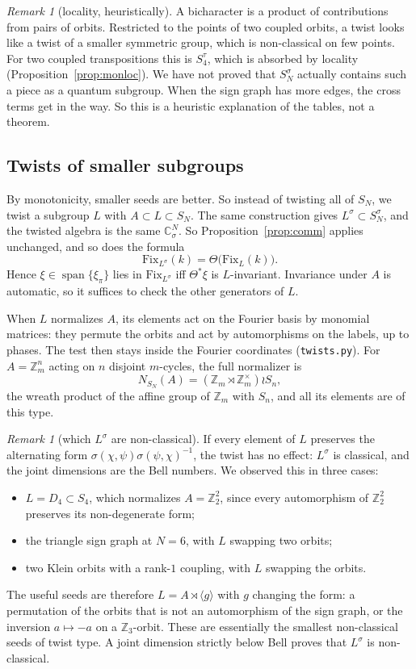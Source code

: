 \documentclass[11pt]{amsart}
\theoremstyle{definition}
\theoremstyle{remark}
\newtheorem{remark}[theorem]{Remark}
\theoremstyle{plain}
\numberwithin{equation}{section}
\numberwithin{table}{section}
\newcommand{\C}{\mathbb C}
\newcommand{\Z}{\mathbb Z}
\newcommand{\Fix}{\mathrm{Fix}}
\DeclareMathOperator{\spn}{span}
\begin{document}
\begin{remark}[locality, heuristically]
A bicharacter is a product of contributions from pairs of orbits. Restricted to the points of two coupled orbits, a twist looks like a twist of a smaller symmetric group, which is non-classical on few points. For two coupled transpositions this is $S_4^\tau$, which is absorbed by locality (Proposition~\ref{prop:monloc}). We have not proved that $S_N^\sigma$ actually contains such a piece as a quantum subgroup. When the sign graph has more edges, the cross terms get in the way. So this is a heuristic explanation of the tables, not a theorem.
\end{remark}

\subsection{Twists of smaller subgroups}

By monotonicity, smaller seeds are better. So instead of twisting all of $S_N$, we twist a subgroup $L$ with $A\subset L\subset S_N$. The same construction gives $L^\sigma\subset S_N^\sigma$, and the twisted algebra is the same $\C^N_\sigma$. So Proposition~\ref{prop:comm} applies unchanged, and so does the formula
\[
\Fix_{L^\sigma}(k)=\Theta\big(\Fix_L(k)\big).
\]
Hence $\xi\in\spn\{\xi_\pi\}$ lies in $\Fix_{L^\sigma}$ iff $\Theta^*\xi$ is $L$-invariant. Invariance under $A$ is automatic, so it suffices to check the other generators of $L$.

When $L$ normalizes $A$, its elements act on the Fourier basis by monomial matrices: they permute the orbits and act by automorphisms on the labels, up to phases. The test then stays inside the Fourier coordinates (\texttt{twists.py}). For $A=\Z_m^n$ acting on $n$ disjoint $m$-cycles, the full normalizer is
\[
N_{S_N}(A)=(\Z_m\rtimes\Z_m^\times)\wr S_n ,
\]
the wreath product of the affine group of $\Z_m$ with $S_n$, and all its elements are of this type.

\begin{remark}[which $L^\sigma$ are non-classical]\label{rem:classical}
If every element of $L$ preserves the alternating form $\sigma(\chi,\psi)\sigma(\psi,\chi)^{-1}$, the twist has no effect: $L^\sigma$ is classical, and the joint dimensions are the Bell numbers. We observed this in three cases:
\begin{itemize}
\item $L=D_4\subset S_4$, which normalizes $A=\Z_2^2$, since every automorphism of $\Z_2^2$ preserves its non-degenerate form;
\item the triangle sign graph at $N=6$, with $L$ swapping two orbits;
\item two Klein orbits with a rank-$1$ coupling, with $L$ swapping the orbits.
\end{itemize}
The useful seeds are therefore $L=A\rtimes\langle g\rangle$ with $g$ changing the form: a permutation of the orbits that is not an automorphism of the sign graph, or the inversion $a\mapsto-a$ on a $\Z_3$-orbit. These are essentially the smallest non-classical seeds of twist type. A joint dimension strictly below Bell proves that $L^\sigma$ is non-classical.
\end{remark}
\end{document}
